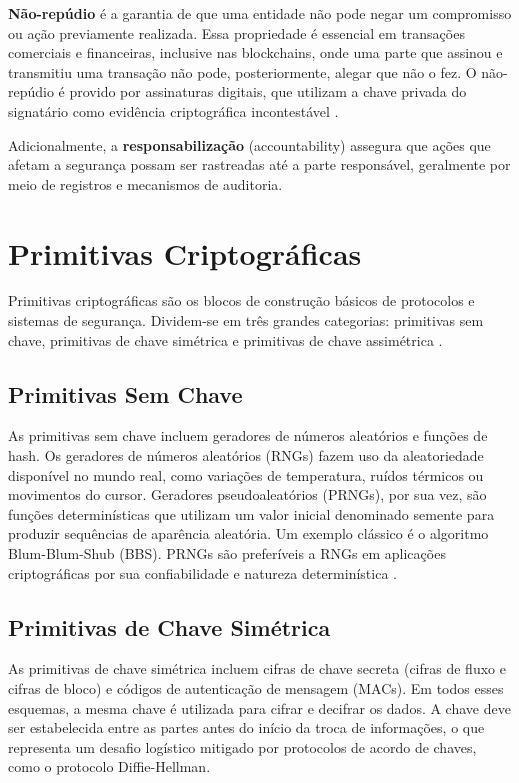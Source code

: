 \documentclass[12pt,a4paper]{report}
\begin{document}
\textbf{Não-repúdio} é a garantia de que uma entidade não pode negar um compromisso ou ação previamente realizada. Essa propriedade é essencial em transações comerciais e financeiras, inclusive nas blockchains, onde uma parte que assinou e transmitiu uma transação não pode, posteriormente, alegar que não o fez. O não-repúdio é provido por assinaturas digitais, que utilizam a chave privada do signatário como evidência criptográfica incontestável \cite{Bashir2023}.

Adicionalmente, a \textbf{responsabilização} (accountability) assegura que ações que afetam a segurança possam ser rastreadas até a parte responsável, geralmente por meio de registros e mecanismos de auditoria.

\section{Primitivas Criptográficas}

Primitivas criptográficas são os blocos de construção básicos de protocolos e sistemas de segurança. Dividem-se em três grandes categorias: primitivas sem chave, primitivas de chave simétrica e primitivas de chave assimétrica \cite{Bashir2023}.

\subsection{Primitivas Sem Chave}

As primitivas sem chave incluem geradores de números aleatórios e funções de hash. Os geradores de números aleatórios (RNGs) fazem uso da aleatoriedade disponível no mundo real, como variações de temperatura, ruídos térmicos ou movimentos do cursor. Geradores pseudoaleatórios (PRNGs), por sua vez, são funções determinísticas que utilizam um valor inicial denominado semente para produzir sequências de aparência aleatória. Um exemplo clássico é o algoritmo Blum-Blum-Shub (BBS). PRNGs são preferíveis a RNGs em aplicações criptográficas por sua confiabilidade e natureza determinística \cite{Bashir2023}.

\subsection{Primitivas de Chave Simétrica}

As primitivas de chave simétrica incluem cifras de chave secreta (cifras de fluxo e cifras de bloco) e códigos de autenticação de mensagem (MACs). Em todos esses esquemas, a mesma chave é utilizada para cifrar e decifrar os dados. A chave deve ser estabelecida entre as partes antes do início da troca de informações, o que representa um desafio logístico mitigado por protocolos de acordo de chaves, como o protocolo Diffie-Hellman.
\end{document}
